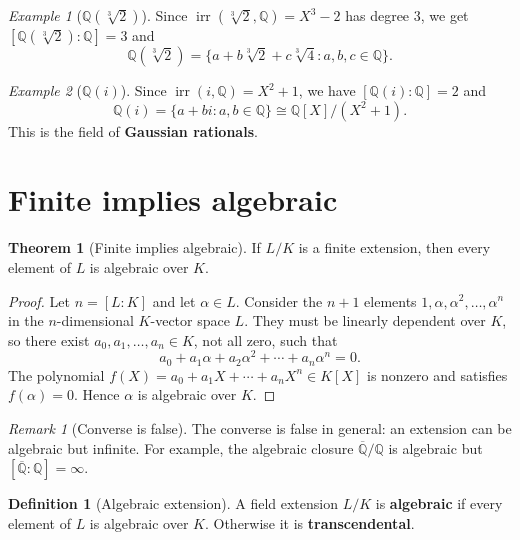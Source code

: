 \documentclass[12pt,a4paper,openany]{book}
\theoremstyle{definition}
\newtheorem{definition}{Definition}[chapter]
\newtheorem{theorem}{Theorem}[chapter]
\theoremstyle{remark}
\newtheorem{remark}{Remark}[chapter]
\newtheorem{example}{Example}[chapter]
\newcommand{\Q}{\mathbb{Q}}
\DeclareMathOperator{\irr}{irr}
\begin{document}
\begin{example}[{$\Q(\sqrt[3]{2})$}]
\label{ex:Q-cbrt2}
\index{Q(cbrt2)@$\Q(\sqrt[3]{2})$}
Since $\irr(\sqrt[3]{2}, \Q) = X^3 - 2$ has degree $3$, we get
$[\Q(\sqrt[3]{2}):\Q] = 3$ and
\[
  \Q(\sqrt[3]{2}) = \{ a + b\sqrt[3]{2} + c\sqrt[3]{4}
    : a, b, c \in \Q \}.
\]
\end{example}

\begin{example}[$\Q(i)$]
\label{ex:Q-i}
\index{Q(i)@$\Q(i)$}
Since $\irr(i, \Q) = X^2 + 1$, we have $[\Q(i):\Q] = 2$ and
\[
  \Q(i) = \{ a + bi : a, b \in \Q \} \cong \Q[X]/(X^2 + 1).
\]
This is the field of \textbf{Gaussian rationals}.
\end{example}

\section{Finite implies algebraic}
\label{sec:finite-implies-algebraic}

\begin{theorem}[Finite implies algebraic]
\label{thm:finite-implies-algebraic}
If $L/K$ is a finite extension, then every element of $L$ is algebraic
over $K$.
\end{theorem}

\begin{proof}
Let $n = [L:K]$ and let $\alpha \in L$. Consider the $n+1$ elements
$1, \alpha, \alpha^2, \dots, \alpha^n$ in the $n$-dimensional
$K$-vector space $L$. They must be linearly dependent over $K$, so
there exist $a_0, a_1, \dots, a_n \in K$, not all zero, such that
\[
  a_0 + a_1 \alpha + a_2 \alpha^2 + \cdots + a_n \alpha^n = 0.
\]
The polynomial $f(X) = a_0 + a_1 X + \cdots + a_n X^n \in K[X]$ is
nonzero and satisfies $f(\alpha) = 0$. Hence $\alpha$ is algebraic
over $K$.
\end{proof}

\begin{remark}[Converse is false]
\label{rem:algebraic-not-finite}
The converse is false in general: an extension can be algebraic but
infinite. For example, the algebraic closure $\overline{\Q}/\Q$ is
algebraic but $[\overline{\Q}:\Q] = \infty$.
\end{remark}

\begin{definition}[Algebraic extension]
\label{def:algebraic-extension}
A field extension $L/K$ is \textbf{algebraic} if every element of $L$
is algebraic over $K$. Otherwise it is \textbf{transcendental}.
\end{definition}
\end{document}
